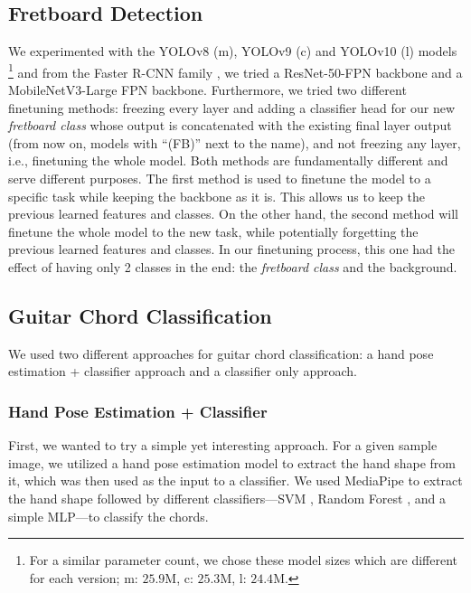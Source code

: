 \documentclass[10pt,twocolumn,letterpaper]{article}
\begin{document}
\subsection{Fretboard Detection}
We experimented with the YOLOv8 (m), YOLOv9 (c) and YOLOv10 (l) models \footnote{For a similar parameter count, we chose these model sizes which are different for each version; m: $25.9$M, c: $25.3$M, l: $24.4$M.} \cite{redmon2016you} and from the Faster R-CNN family \cite{ren2016faster}, we tried a ResNet-50-FPN backbone and a MobileNetV3-Large FPN backbone. Furthermore, we tried two different finetuning methods: freezing every layer and adding a classifier head for our new \emph{fretboard class} whose output is concatenated with the existing final layer output (from now on, models with ``(FB)'' next to the name), and not freezing any layer, i.e., finetuning the whole model. Both methods are fundamentally different and serve different purposes. The first method is used to finetune the model to a specific task while keeping the backbone as it is. This allows us to keep the previous learned features and classes. On the other hand, the second method will finetune the
whole model to the new task, while potentially forgetting the previous learned features and classes. In our finetuning process, this one had the effect of having only 2 classes in the end: the \emph{fretboard class} and the background.

\subsection{Guitar Chord Classification}
We used two different approaches for guitar chord classification: a hand pose estimation + classifier approach and a classifier only approach.

\subsubsection{Hand Pose Estimation + Classifier}
First, we wanted to try a simple yet interesting approach. For a given sample image, we utilized a hand pose estimation model to extract the hand shape from it, which was then used as the input to a classifier. We used MediaPipe to extract the hand shape followed by different classifiers—SVM \cite{cortes1995support}, Random Forest \cite{ho1995random}, and a simple MLP—to classify the chords.

\end{document}
